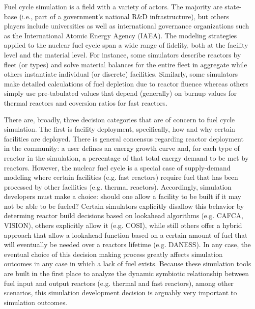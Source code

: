 Fuel cycle simulation is a field with a variety of actors. The majority are
state-base (i.e., part of a government's national R\&D infrastructure), but
others players include universities as well as international governance
organizations such as the International Atomic Energy Agency (IAEA). The
modeling strategies applied to the nuclear fuel cycle span a wide range of
fidelity, both at the facility level and the material level. For instance, some
simulators describe reactors by fleet (or types) and solve material balances for
the entire fleet in aggregate while others instantiate individual (or discrete)
facilities. Similarly, some simulators make detailed calculations of fuel
depletion due to reactor fluence whereas others simply use pre-tabulated values
that depend (generally) on burnup values for thermal reactors and coversion
ratios for fast reactors. 

There are, broadly, three decision categories that are of concern to fuel cycle
simulation. The first is facility deployment, specifically, how and why certain
facilities are deployed. There is general concensus regarding reactor deployment
in the community: a user defines an energy growth curve and, for each type of
reactor in the simulation, a percentage of that total energy demand to be met by
reactors. However, the nuclear fuel cycle is a special case of supply-demand
modeling where certain facilities (e.g. fast reactors) require fuel that has
been processed by other facilities (e.g. thermal reactors). Accordingly,
simulation developers must make a choice: should one allow a facility to be
built if it may not be able to be fueled? Certain simulators explicitly disallow
this behavior by determing reactor build decisions based on lookahead algorithms
(e.g. CAFCA, VISION), others explicitly allow it (e.g. COSI), while still others
offer a hybrid approach that allow a lookahead function based on a certain
amount of fuel that will eventually be needed over a reactors lifetime
(e.g. DANESS). In any case, the eventual choice of this decision making process
greatly affects simulation outcomes in any case in which a lack of fuel
exists. Because these simulation tools are built in the first place to analyze
the dynamic symbiotic relationship between fuel input and output reactors
(e.g. thermal and fast reactors), among other scenarios, this simulation
development decision is arguably very important to simulation outcomes.

